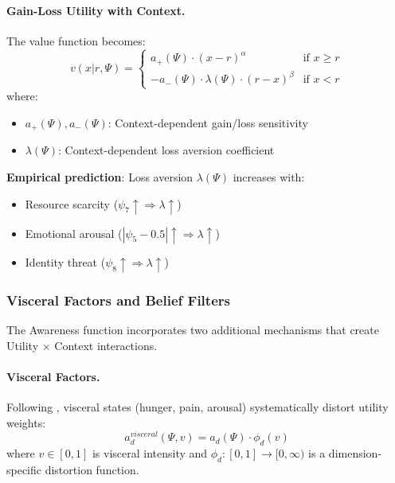 \paragraph{Gain-Loss Utility with Context.}

The value function becomes:
\begin{equation}
v(x | r, \Psi) = \begin{cases}
a_+(\Psi) \cdot (x - r)^\alpha & \text{if } x \geq r \\
-a_-(\Psi) \cdot \lambda(\Psi) \cdot (r - x)^\beta & \text{if } x < r
\end{cases}
\end{equation}
where:
\begin{itemize}
    \item $a_+(\Psi), a_-(\Psi)$: Context-dependent gain/loss sensitivity
    \item $\lambda(\Psi)$: Context-dependent loss aversion coefficient
\end{itemize}

\textbf{Empirical prediction}: Loss aversion $\lambda(\Psi)$ increases with:
\begin{itemize}
    \item Resource scarcity ($\psi_7 \uparrow \Rightarrow \lambda \uparrow$)
    \item Emotional arousal ($|\psi_5 - 0.5| \uparrow \Rightarrow \lambda \uparrow$)
    \item Identity threat ($\psi_8 \uparrow \Rightarrow \lambda \uparrow$)
\end{itemize}

\subsubsection{Visceral Factors and Belief Filters}

The Awareness function incorporates two additional mechanisms that create 
Utility $\times$ Context interactions.

\paragraph{Visceral Factors.}

Following \citet{loewenstein2000emotions}, visceral states (hunger, pain, arousal) 
systematically distort utility weights:
\begin{equation}
a_d^{visceral}(\Psi, v) = a_d(\Psi) \cdot \phi_d(v)
\end{equation}
where $v \in [0,1]$ is visceral intensity and $\phi_d: [0,1] \to [0, \infty)$ is 
a dimension-specific distortion function.

